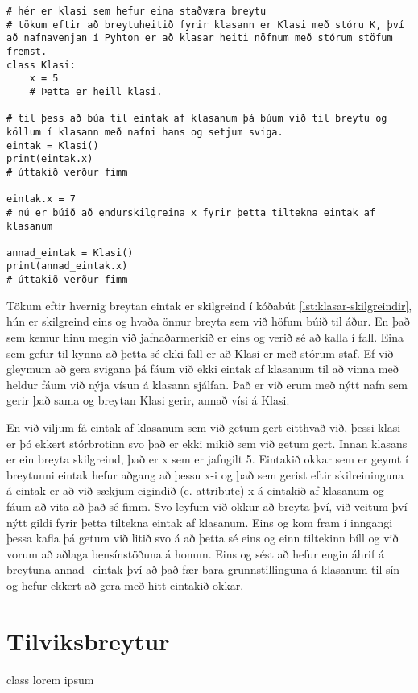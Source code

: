 \begin{lstlisting}[caption=Klasar skilgreindir, label=lst:klasar-skilgreindir]
# hér er klasi sem hefur eina staðværa breytu
# tökum eftir að breytuheitið fyrir klasann er Klasi með stóru K, því að nafnavenjan í Pyhton er að klasar heiti nöfnum með stórum stöfum fremst.
class Klasi:
	x = 5
	# Þetta er heill klasi.
	
# til þess að búa til eintak af klasanum þá búum við til breytu og köllum í klasann með nafni hans og setjum sviga.
eintak = Klasi()
print(eintak.x)
# úttakið verður fimm

eintak.x = 7
# nú er búið að endurskilgreina x fyrir þetta tiltekna eintak af klasanum

annad_eintak = Klasi()
print(annad_eintak.x)
# úttakið verður fimm 
\end{lstlisting}

Tökum eftir hvernig breytan eintak er skilgreind í kóðabút \ref{lst:klasar-skilgreindir}, hún er skilgreind eins og hvaða önnur breyta sem við höfum búið til áður.
En það sem kemur hinu megin við jafnaðarmerkið er eins og verið sé að kalla í fall.
Eina sem gefur til kynna að þetta sé ekki fall er að Klasi er með stórum staf.
Ef við gleymum að gera svigana þá fáum við ekki eintak af klasanum til að vinna með heldur fáum við nýja vísun á klasann sjálfan.
Það er við erum með nýtt nafn sem gerir það sama og breytan Klasi gerir, annað vísi á Klasi.

En við viljum fá eintak af klasanum sem við getum gert eitthvað við, þessi klasi er þó ekkert stórbrotinn svo það er ekki mikið sem við getum gert.
Innan klasans er ein breyta skilgreind, það er x sem er jafngilt 5.
Eintakið okkar sem er geymt í breytunni eintak hefur aðgang að þessu x-i og það sem gerist eftir skilreininguna á eintak er að við sækjum eigindið (e. attribute) x á eintakið af klasanum og fáum að vita að það sé fimm.
Svo leyfum við okkur að breyta því, við veitum því nýtt gildi fyrir þetta tiltekna eintak af klasanum.
Eins og kom fram í inngangi þessa kafla þá getum við litið svo á að þetta sé eins og einn tiltekinn bíll og við vorum að aðlaga bensínstöðuna á honum.
Eins og sést að hefur engin áhrif á breytuna annad\_eintak því að það fær bara grunnstillinguna á klasanum til sín og hefur ekkert að gera með hitt eintakið okkar.

\section{Tilviksbreytur}\label{uk:klasar-tilviksbreytur}
class lorem ipsum

